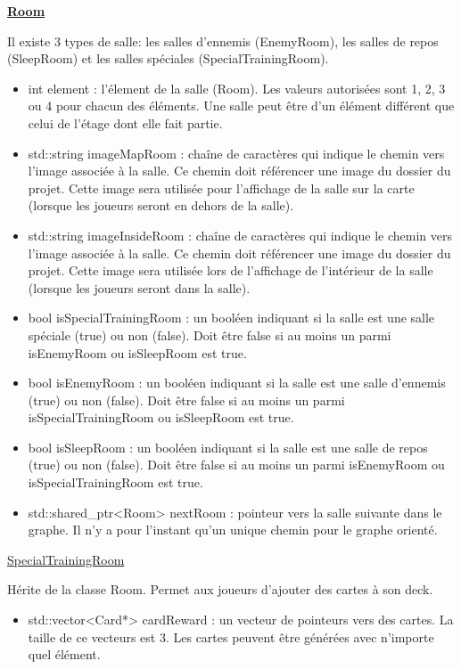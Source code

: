 \underline{\textbf{Room}}
\par Il existe 3 types de salle: les salles d'ennemis (EnemyRoom), les salles de repos (SleepRoom) et les salles spéciales (SpecialTrainingRoom).
\begin{itemize}
    \item int element : l'élement de la salle (Room). Les valeurs autorisées sont 1, 2, 3 ou 4 pour chacun des éléments. Une salle peut être d'un élément différent que celui de l'étage dont elle fait partie.
    \item std::string imageMapRoom : chaîne de caractères qui indique le chemin vers l'image associée à la salle. Ce chemin doit référencer une image du dossier du projet. Cette image sera utilisée pour l'affichage de la salle sur la carte (lorsque les joueurs seront en dehors de la salle).
    \item std::string imageInsideRoom : chaîne de caractères qui indique le chemin vers l'image associée à la salle. Ce chemin doit référencer une image du dossier du projet. Cette image sera utilisée lors de l'affichage de l'intérieur de la salle (lorsque les joueurs seront dans la salle).
    \item bool isSpecialTrainingRoom : un booléen indiquant si la salle est une salle spéciale (true) ou non (false). Doit être false si au moins un parmi isEnemyRoom ou isSleepRoom est true.
    \item bool isEnemyRoom : un booléen indiquant si la salle est une salle d'ennemis (true) ou non (false). Doit être false si au moins un parmi isSpecialTrainingRoom ou isSleepRoom est true.
    \item bool isSleepRoom : un booléen indiquant si la salle est une salle de repos (true) ou non (false). Doit être false si au moins un parmi isEnemyRoom ou isSpecialTrainingRoom est true.
    \item std::shared\_ptr<Room> nextRoom : pointeur vers la salle suivante dans le graphe. Il n'y a pour l'instant qu'un unique chemin pour le graphe orienté.
\end{itemize}

\underline{SpecialTrainingRoom}
\par Hérite de la classe Room. Permet aux joueurs d'ajouter des cartes à son deck.
\begin{itemize}
    \item std::vector<Card*> cardReward : un vecteur de pointeurs vers des cartes. La taille de ce vecteurs est 3. Les cartes peuvent être générées avec n'importe quel élément.
\end{itemize}

